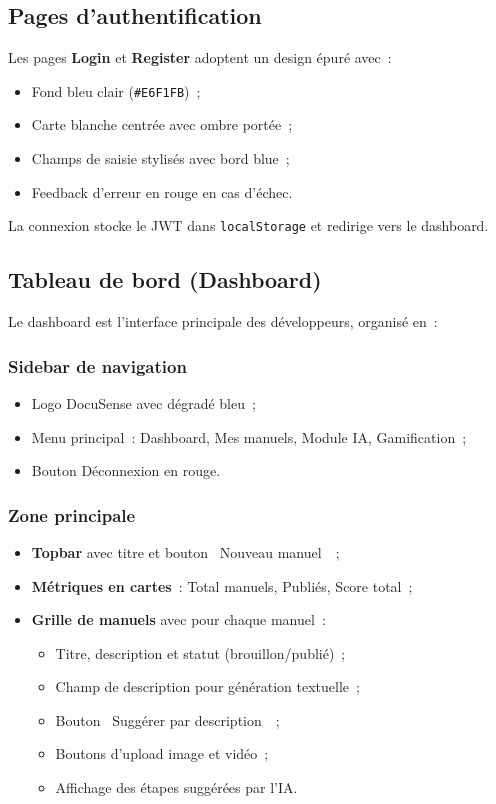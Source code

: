 \documentclass[12pt, a4paper, twoside, openany]{report}
\begin{document}
\subsection{Pages d'authentification}

Les pages \textbf{Login} et \textbf{Register} adoptent un design \'epur\'e avec~:
\begin{itemize}
  \item Fond bleu clair (\texttt{\#E6F1FB})~;
  \item Carte blanche centr\'ee avec ombre port\'ee~;
  \item Champs de saisie stylis\'es avec bord blue~;
  \item Feedback d'erreur en rouge en cas d'\'echec.
\end{itemize}

La connexion stocke le JWT dans \texttt{localStorage} et redirige vers le dashboard.

\subsection{Tableau de bord (Dashboard)}

Le dashboard est l'interface principale des d\'eveloppeurs, organis\'e en~:

\subsubsection{Sidebar de navigation}
\begin{itemize}
  \item Logo DocuSense avec d\'egrad\'e bleu~;
  \item Menu principal~: Dashboard, Mes manuels, Module IA, Gamification~;
  \item Bouton D\'econnexion en rouge.
\end{itemize}

\subsubsection{Zone principale}
\begin{itemize}
  \item \textbf{Topbar} avec titre et bouton \guillemotleft~Nouveau manuel~\guillemotright~;
  \item \textbf{M\'etriques en cartes}~: Total manuels, Publi\'es, Score total~;
  \item \textbf{Grille de manuels} avec pour chaque manuel~:
    \begin{itemize}
      \item Titre, description et statut (brouillon/publi\'e)~;
      \item Champ de description pour g\'en\'eration textuelle~;
      \item Bouton \guillemotleft~Sugg\'erer par description~\guillemotright~;
      \item Boutons d'upload image et vid\'eo~;
      \item Affichage des \'etapes sugg\'er\'ees par l'IA.
    \end{itemize}
\end{itemize}
\end{document}
